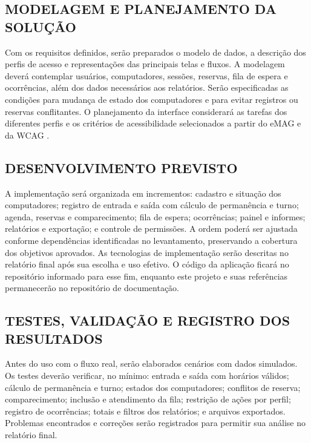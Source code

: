\documentclass[12pt,a4paper]{article}
\begin{document}
\subsection{MODELAGEM E PLANEJAMENTO DA SOLUÇÃO}

Com os requisitos definidos, serão preparados o modelo de dados, a descrição dos perfis de acesso e representações das principais telas e fluxos. A modelagem deverá contemplar usuários, computadores, sessões, reservas, fila de espera e ocorrências, além dos dados necessários aos relatórios. Serão especificadas as condições para mudança de estado dos computadores e para evitar registros ou reservas conflitantes. O planejamento da interface considerará as tarefas dos diferentes perfis e os critérios de acessibilidade selecionados a partir do eMAG e da WCAG \cite{barbosaSilva2010,emag2014,wcag22_2024}.

\subsection{DESENVOLVIMENTO PREVISTO}

A implementação será organizada em incrementos: cadastro e situação dos computadores; registro de entrada e saída com cálculo de permanência e turno; agenda, reservas e comparecimento; fila de espera; ocorrências; painel e informes; relatórios e exportação; e controle de permissões. A ordem poderá ser ajustada conforme dependências identificadas no levantamento, preservando a cobertura dos objetivos aprovados. As tecnologias de implementação serão descritas no relatório final após sua escolha e uso efetivo. O código da aplicação ficará no repositório informado para esse fim, enquanto este projeto e suas referências permanecerão no repositório de documentação.

\subsection{TESTES, VALIDAÇÃO E REGISTRO DOS RESULTADOS}

Antes do uso com o fluxo real, serão elaborados cenários com dados simulados. Os testes deverão verificar, no mínimo: entrada e saída com horários válidos; cálculo de permanência e turno; estados dos computadores; conflitos de reserva; comparecimento; inclusão e atendimento da fila; restrição de ações por perfil; registro de ocorrências; totais e filtros dos relatórios; e arquivos exportados. Problemas encontrados e correções serão registrados para permitir sua análise no relatório final.
\end{document}
